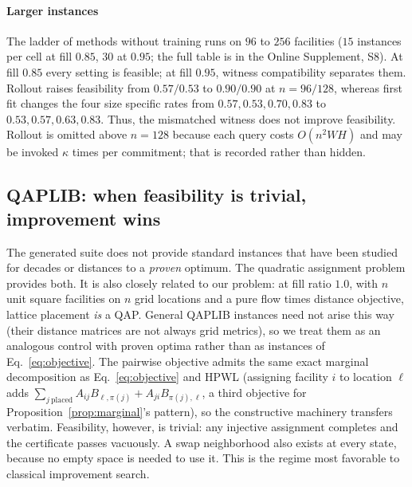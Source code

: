 \documentclass[preprint,12pt,authoryear]{elsarticle}
\begin{document}
\paragraph{Larger instances}
The ladder of methods without training runs on $96$ to $256$ facilities ($15$ instances per
cell at fill $0.85$, $30$ at $0.95$; the full table is in the Online
Supplement, S8). At fill $0.85$ every setting is feasible; at fill $0.95$,
witness compatibility separates them. Rollout raises feasibility from
$0.57/0.53$ to $0.90/0.90$ at $n=96/128$, whereas first fit changes the four
size specific rates from $0.57,0.53,0.70,0.83$ to $0.53,0.57,0.63,0.83$. Thus,
the mismatched witness does not improve feasibility. Rollout is omitted above $n=128$ because each
query costs $O(n^2WH)$ and may be invoked $\kappa$ times per commitment; that
is recorded rather than hidden.

\subsection{QAPLIB: when feasibility is trivial, improvement wins}
\label{sec:results_qap}

The generated suite does not provide standard instances that have been studied
for decades or distances to a \emph{proven} optimum. The quadratic assignment
problem \citep{Koopmans1957QAP} provides both. It is also closely related to our problem:
at fill ratio $1.0$, with $n$ unit square facilities on $n$ grid locations and a
pure flow times distance objective, lattice placement \emph{is} a QAP. General
QAPLIB instances need not arise this way (their distance matrices are not always
grid metrics), so we treat them as an analogous control with proven optima
rather than as instances of Eq.~\eqref{eq:objective}.
The pairwise objective admits the same exact marginal decomposition as
Eq.~\eqref{eq:objective} and HPWL (assigning facility $i$ to location $\ell$
adds $\sum_{j\ \text{placed}} A_{ij}B_{\ell,\pi(j)}+A_{ji}B_{\pi(j),\ell}$, a
third objective for Proposition~\ref{prop:marginal}'s pattern), so the
constructive machinery transfers verbatim. Feasibility, however, is trivial:
any injective assignment completes and the certificate passes vacuously. A
swap neighborhood also exists at every state, because no empty space is needed
to use it. This is the regime most favorable to classical improvement
search.
\end{document}

